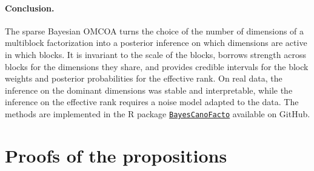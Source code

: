 \documentclass[11pt]{article}
\begin{document}
\paragraph{Conclusion.} The sparse Bayesian OMCOA turns the choice of the number of dimensions of a multiblock factorization into a posterior inference on which dimensions are active in which blocks. It is invariant to the scale of the blocks, borrows strength across blocks for the dimensions they share, and provides credible intervals for the block weights and posterior probabilities for the effective rank. On real data, the inference on the dominant dimensions was stable and interpretable, while the inference on the effective rank requires a noise model adapted to the data. The methods are implemented in the \textsf{R} package  \href{https://github.com/GALHARRET/BayesCanoFacto}{\texttt{BayesCanoFacto}} available on GitHub.



\clearpage







\appendix
\section{Proofs of the propositions}\label{sec:proofs}
\end{document}
